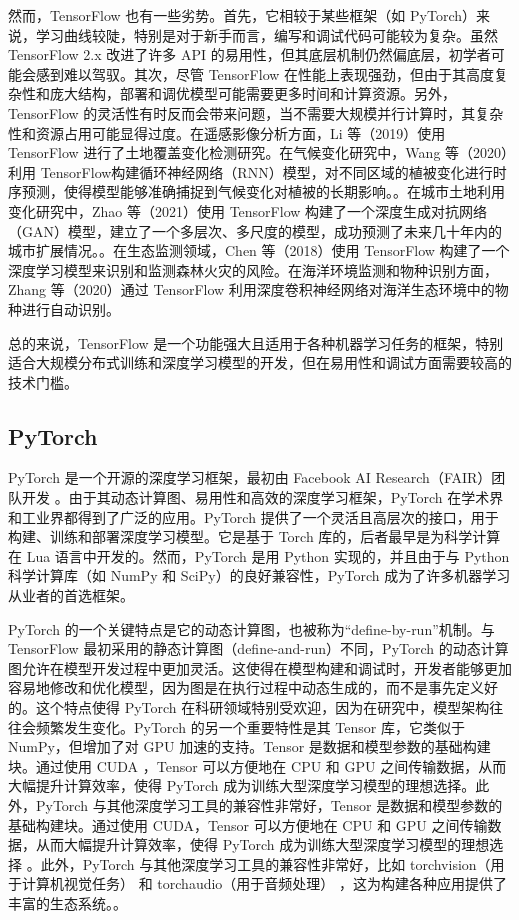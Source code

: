 \documentclass[AutoFakeBold]{LZUThesis-PgD&PhD}
\begin{document}
	然而，TensorFlow 也有一些劣势。首先，它相较于某些框架（如 PyTorch）来说，学习曲线较陡，特别是对于新手而言，编写和调试代码可能较为复杂。虽然 TensorFlow 2.x 改进了许多 API 的易用性，但其底层机制仍然偏底层，初学者可能会感到难以驾驭。其次，尽管 TensorFlow 在性能上表现强劲，但由于其高度复杂性和庞大结构，部署和调优模型可能需要更多时间和计算资源。另外，TensorFlow 的灵活性有时反而会带来问题，当不需要大规模并行计算时，其复杂性和资源占用可能显得过度。在遥感影像分析方面，Li 等（2019）使用 TensorFlow 进行了土地覆盖变化检测研究\cite{li2019}。在气候变化研究中，Wang 等（2020）利用 TensorFlow构建循环神经网络（RNN）模型，对不同区域的植被变化进行时序预测，使得模型能够准确捕捉到气候变化对植被的长期影响。\cite{wang2020H}。在城市土地利用变化研究中，Zhao 等（2021）使用 TensorFlow 构建了一个深度生成对抗网络（GAN）模型，建立了一个多层次、多尺度的模型，成功预测了未来几十年内的城市扩展情况。\cite{zhao2021}。在生态监测领域，Chen 等（2018）使用 TensorFlow 构建了一个深度学习模型来识别和监测森林火灾的风险\cite{chen2018}。在海洋环境监测和物种识别方面，Zhang 等（2020）通过 TensorFlow 利用深度卷积神经网络对海洋生态环境中的物种进行自动识别\cite{zhang2020}。
	
	总的来说，TensorFlow 是一个功能强大且适用于各种机器学习任务的框架，特别适合大规模分布式训练和深度学习模型的开发，但在易用性和调试方面需要较高的技术门槛。

	\subsection{PyTorch}
	
	PyTorch 是一个开源的深度学习框架，最初由 Facebook AI Research（FAIR）团队开发 \cite{paszke2019pytorch}。由于其动态计算图、易用性和高效的深度学习框架，PyTorch 在学术界和工业界都得到了广泛的应用。PyTorch 提供了一个灵活且高层次的接口，用于构建、训练和部署深度学习模型。它是基于 Torch 库的，后者最早是为科学计算在 Lua 语言中开发的。然而，PyTorch 是用 Python 实现的，并且由于与 Python 科学计算库（如 NumPy 和 SciPy）的良好兼容性，PyTorch 成为了许多机器学习从业者的首选框架。
	
	PyTorch 的一个关键特点是它的动态计算图，也被称为“define-by-run”机制。与 TensorFlow 最初采用的静态计算图（define-and-run）不同，PyTorch 的动态计算图允许在模型开发过程中更加灵活。这使得在模型构建和调试时，开发者能够更加容易地修改和优化模型，因为图是在执行过程中动态生成的，而不是事先定义好的。这个特点使得 PyTorch 在科研领域特别受欢迎，因为在研究中，模型架构往往会频繁发生变化。PyTorch 的另一个重要特性是其 Tensor 库，它类似于 NumPy，但增加了对 GPU 加速的支持。Tensor 是数据和模型参数的基础构建块。通过使用 CUDA \cite{cuda}，Tensor 可以方便地在 CPU 和 GPU 之间传输数据，从而大幅提升计算效率，使得 PyTorch 成为训练大型深度学习模型的理想选择。此外，PyTorch 与其他深度学习工具的兼容性非常好，Tensor 是数据和模型参数的基础构建块。通过使用 CUDA，Tensor 可以方便地在 CPU 和 GPU 之间传输数据，从而大幅提升计算效率，使得 PyTorch 成为训练大型深度学习模型的理想选择 \cite{pytorch}。此外，PyTorch 与其他深度学习工具的兼容性非常好，比如 torchvision（用于计算机视觉任务） \cite{torchvision} 和 torchaudio（用于音频处理） \cite{torchaudio}，这为构建各种应用提供了丰富的生态系统。。
	
\end{document}
